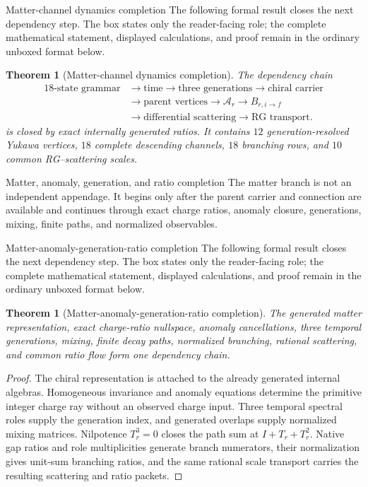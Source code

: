 \documentclass[11pt]{article}
\numberwithin{equation}{section}
\newtheorem{theorem}[definition]{Theorem}
\theoremstyle{remark}
\begin{document}
\begin{proofguide}{Matter-channel dynamics completion}
The following formal result closes the next dependency step. The box states only the reader-facing role; the complete mathematical statement, displayed calculations, and proof remain in the ordinary unboxed format below.
\end{proofguide}
\begin{theorem}[Matter-channel dynamics completion]
The dependency chain
\begin{equation}
\begin{aligned}
18\text{-state grammar}&\to\text{time}\to\text{three generations}\to\text{chiral carrier}\\
&\to\text{parent vertices}\to\mathcal A_r\to B_{r,i\to f}\\
&\to\text{differential scattering}\to\text{RG transport}.
\end{aligned}
\end{equation}
is closed by exact internally generated ratios. It contains $12$ generation-resolved Yukawa vertices, $18$ complete descending channels, $18$ branching rows, and $10$ common RG--scattering scales.
\end{theorem}


\begin{proofguide}{Matter, anomaly, generation, and ratio completion}
The matter branch is not an independent appendage. It begins only after the parent carrier and connection are available and continues through exact charge ratios, anomaly closure, generations, mixing, finite paths, and normalized observables.
\end{proofguide}
\begin{proofguide}{Matter-anomaly-generation-ratio completion}
The following formal result closes the next dependency step. The box states only the reader-facing role; the complete mathematical statement, displayed calculations, and proof remain in the ordinary unboxed format below.
\end{proofguide}
\begin{theorem}[Matter-anomaly-generation-ratio completion]
The generated matter representation, exact charge-ratio nullspace, anomaly cancellations, three temporal generations, mixing, finite decay paths, normalized branching, rational scattering, and common ratio flow form one dependency chain.
\end{theorem}
\begin{proof}
The chiral representation is attached to the already generated internal algebras. Homogeneous invariance and anomaly equations determine the primitive integer charge ray without an observed charge input. Three temporal spectral roles supply the generation index, and generated overlaps supply normalized mixing matrices. Nilpotence $T_r^3=0$ closes the path sum at $I+T_r+T_r^2$. Native gap ratios and role multiplicities generate branch numerators, their normalization gives unit-sum branching ratios, and the same rational scale transport carries the resulting scattering and ratio packets.
\end{proof}
\end{document}

